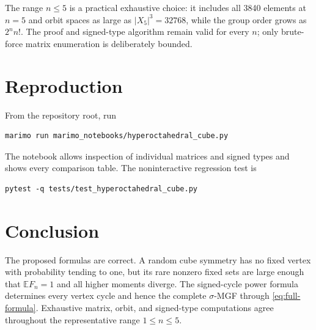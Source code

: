 \documentclass[11pt]{article}
\newcommand{\E}{\mathbb E}
\begin{document}
The range $n\leq5$ is a practical exhaustive choice: it includes all 3840
elements at $n=5$ and orbit spaces as large as $|X_5|^3=32768$, while the
group order grows as $2^n n!$.  The proof and signed-type algorithm remain
valid for every $n$; only brute-force matrix enumeration is deliberately
bounded.

\section{Reproduction}
From the repository root, run
\begin{verbatim}
marimo run marimo_notebooks/hyperoctahedral_cube.py
\end{verbatim}
The notebook allows inspection of individual matrices and signed types and
shows every comparison table.  The noninteractive regression test is
\begin{verbatim}
pytest -q tests/test_hyperoctahedral_cube.py
\end{verbatim}

\section{Conclusion}
The proposed formulas are correct.  A random cube symmetry has no fixed
vertex with probability tending to one, but its rare nonzero fixed sets are
large enough that $\E F_n=1$ and all higher moments diverge.  The signed-cycle
power formula determines every vertex cycle and hence the complete
$\sigma$-MGF through \eqref{eq:full-formula}.  Exhaustive matrix, orbit, and
signed-type computations agree throughout the representative range
$1\leq n\leq5$.
\end{document}

